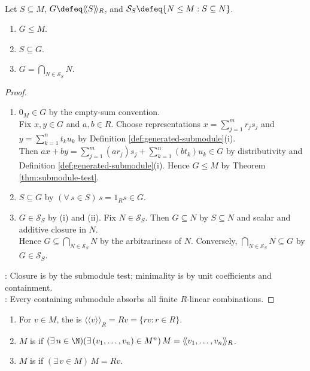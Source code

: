 \begin{proposition} \label{prop:generated-submodule-smallest} \\
Let $S\subseteq M$, $G\defeq\langle\!\langle S\rangle\!\rangle_R$, and $\mathcal{S}_S\defeq\{N\leq M:S\subseteq N\}$.
\begin{enumerate}[label=(\roman*)]
\setlength{\itemsep}{0pt}
\item $G\leq M$.
\item $S\subseteq G$.
\item $G=\bigcap\limits_{N\in\mathcal{S}_S}N$.
\end{enumerate}
\begin{proof}
\begin{enumerate}[label=(\roman*)]
\setlength{\itemsep}{0pt}
\item $0_M\in G$ by the empty-sum convention.\\
Fix $x,y\in G$ and $a,b\in R$. Choose representations $x=\sum\limits_{j=1}^{m}r_js_j$ and $y=\sum\limits_{k=1}^{n}t_ku_k$ by Definition \ref{def:generated-submodule}(i).\\
Then $ax+by=\sum\limits_{j=1}^{m}(ar_j)s_j+\sum\limits_{k=1}^{n}(bt_k)u_k\in G$ by distributivity and Definition \ref{def:generated-submodule}(i). Hence $G\leq M$ by Theorem \ref{thm:submodule-test}.
\item $S\subseteq G$ by $(\forall\,s\in S)\,s=1_Rs\in G$.
\item $G\in\mathcal{S}_S$ by (i) and (ii). Fix $N\in\mathcal{S}_S$. Then $G\subseteq N$ by $S\subseteq N$ and scalar and additive closure in $N$.\\
Hence $G\subseteq\bigcap\limits_{N\in\mathcal{S}_S}N$ by the arbitrariness of $N$. Conversely, $\bigcap\limits_{N\in\mathcal{S}_S}N\subseteq G$ by $G\in\mathcal{S}_S$.
\end{enumerate}
: Closure is by the submodule test; minimality is by unit coefficients and containment.\\
: Every containing submodule absorbs all finite $R$-linear combinations.
\end{proof}
\end{proposition}

\begin{definition} \label{def:cyclic-and-finitely-generated-modules} 
\begin{enumerate}[label=(\roman*)]
\setlength{\itemsep}{0pt}
\item For $v\in M$, the  is $\langle\!\langle v\rangle\!\rangle_R=Rv=\{rv:r\in R\}$.
\item $M$ is  if $(\exists\,n\in\N)(\exists\,(v_1,\ldots,v_n)\in M^n)\,M=\langle\!\langle v_1,\ldots,v_n\rangle\!\rangle_R$.
\item $M$ is  if $(\exists\,v\in M)\,M=Rv$.
\end{enumerate}
\end{definition}

